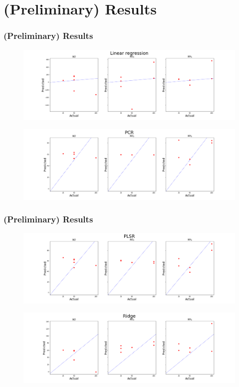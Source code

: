 \documentclass{beamer}
\begin{document}
\section{(Preliminary) Results}
\begin{frame}
	\frametitle{(Preliminary) Results}
	\pause
	\begin{figure}[!htb]
		\centering
		\includegraphics[width=1\textwidth]{../../figures/lr_plot.png}
	\end{figure} 
	\pause

\begin{figure}[!htb]
	\centering
	\includegraphics[width=1\textwidth]{../../figures/pcr_plot.png}
\end{figure}
\end{frame}

\begin{frame}
	\frametitle{(Preliminary) Results}
	\pause
	\begin{figure}[!htb]
		\centering
		\includegraphics[width=1\textwidth]{../../figures/plsr_plot.png}
	\end{figure} 
	\pause
	
	\begin{figure}[!htb]
		\centering
		\includegraphics[width=1\textwidth]{../../figures/ridge_plot.png}
	\end{figure}
\end{frame}
\end{document}
